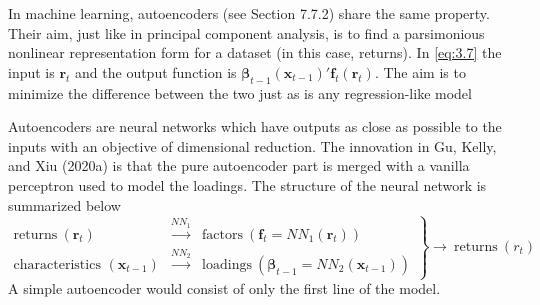 In machine learning, autoencoders (see Section 7.7.2) share the same property. Their aim, just like in principal component analysis, is to find a parsimonious nonlinear representation form for a dataset (in this case, returns). In \eqref{eq:3.7} the input is $\mathbf{r}_{t}$ and the output function is $\boldsymbol{\beta }_{t-1}(\mathbf{x}_{t-1})'\mathbf{f}_{t}(\mathbf{r}_{t})$. The aim is to minimize the difference between the two just as is any regression-like model

\begin{defn}[Autoencoders]
  Autoencoders are neural networks which have outputs as close as possible to the inputs with an objective of dimensional reduction. The innovation in Gu, Kelly, and Xiu (2020a) is that the pure autoencoder part is merged with a vanilla perceptron used to model the loadings. The structure of the neural network is summarized below
  \[
    \left.\begin{array}{rcl}\mathrm{returns~}(\mathbf{r}_{t})&\xrightarrow{NN_{1}}&\mathrm{factors~}(\mathbf{f}_{t}=NN_{1}(\mathbf{r}_{t}))\\\text{characteristics }(\mathbf{x}_{t-1})&\xrightarrow{NN_{2}}&\mathrm{loadings~}(\boldsymbol{\beta}_{t-1}=NN_{2}(\mathbf{x}_{t-1}))\end{array}\right\}\longrightarrow\mathrm{~returns~}(r_{t})
  \]
  A simple autoencoder would consist of only the first line of the model.
\end{defn}